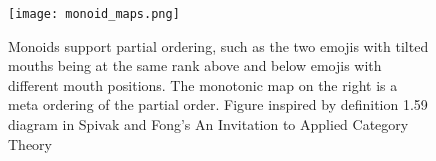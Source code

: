 \begin{figure}[tb]
    \centering %
    \texttt{[image: monoid\_maps.png]}
    \caption{Monoids support partial ordering, such as the two emojis with tilted mouths being at the same rank above and below emojis with different mouth positions. The monotonic map on the right is a meta ordering of the partial order.  Figure inspired by definition 1.59 diagram in Spivak and Fong's An Invitation to Applied Category Theory \cite{fongInvitationAppliedCategory2019}}
    \label{fig:data_partial_order}
  \end{figure}
  


